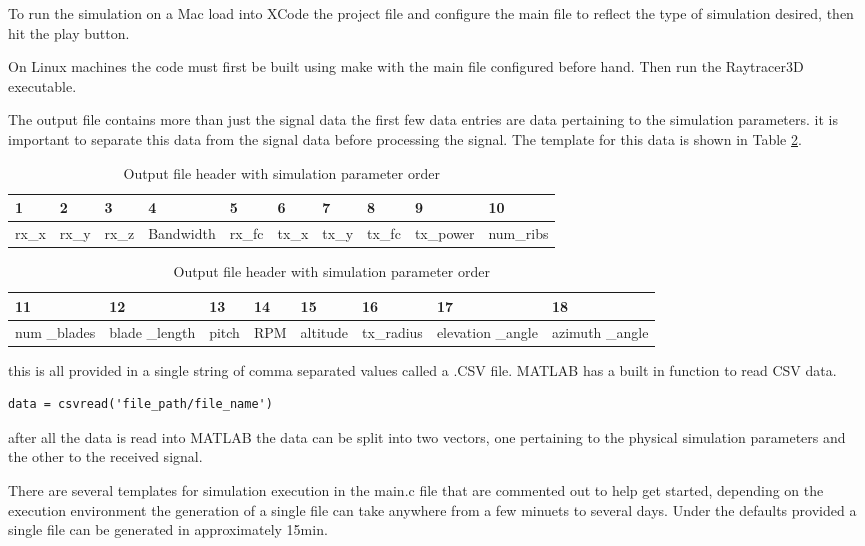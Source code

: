 To run the simulation on a Mac load into XCode the project file and configure the main file to reflect the type of simulation desired, then hit the play button.

On Linux machines the code must first be built using make with the main file configured before hand. Then run the Raytracer3D executable.

The output file contains more than just the signal data the first few data entries are data pertaining to the simulation parameters. it is important to separate this data from the signal data before processing the signal. The template for this data is shown in Table 
\ref{tab:file_values}.

\begin{table}
\begin{center}
    \begin{tabular}{| l | l | l | l | l | l | l | l | l | l |}
    \hline
    1 & 2 & 3 & 4 & 5 & 6 & 7 & 8 & 9 & 10 \\ \hline
      rx\_x & rx\_y & rx\_z & Bandwidth & rx\_fc & tx\_x & tx\_y & tx\_fc & tx\_power & num\_ribs \\ \hline
    \end{tabular}
    \begin{tabular}{| p{1cm} | p{1cm} | l | l | l | l | p{1.5cm} | p{1.5cm} |}
    \hline
    11 & 12 & 13 & 14 & 15 & 16 & 17 & 18\\ \hline
     num \_blades & blade \_length & pitch & RPM & altitude & tx\_radius & elevation \_angle & azimuth \_angle \\ \hline
    \end{tabular}
     \caption{Output file header with simulation parameter order}
    \label{tab:file_values}
\end{center}
\end{table}

this is all provided in a single string of comma separated values called a .CSV file. MATLAB has a built in function to read CSV data.

\begin{lstlisting}
data = csvread('file_path/file_name')
\end{lstlisting}

after all the data is read into MATLAB the data can be split into two vectors, one pertaining to the physical simulation parameters and the other to the received signal.

There are several templates for simulation execution in the main.c file that are commented out to help get started, depending on the execution environment the generation of a single file can take anywhere from a few minuets to several days. Under the defaults provided a single file can be generated in approximately 15min.
 